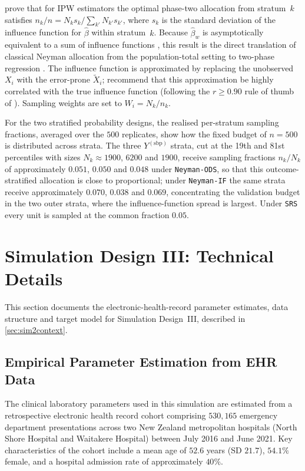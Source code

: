 \citet[Section~4.1]{amorim2021two} prove that for IPW estimators the optimal phase-two allocation from stratum~$k$ satisfies $n_k / n = N_k s_k / \sum_{k'} N_{k'} s_{k'}$, where $s_k$ is the standard deviation of the influence function for $\hat{\beta}$ within stratum~$k$. Because $\hat{\beta}_w$ is asymptotically equivalent to a sum of influence functions \citep[eq.~10]{amorim2021two}, this result is the direct translation of classical Neyman allocation from the population-total setting to two-phase regression \citep{lumley2011connections, mcisaac2014response}. The influence function is approximated by replacing the unobserved $X_i$ with the error-prone $\tilde{X}_i$; \citet{amorim2021two} recommend that this approximation be highly correlated with the true influence function (following the $r \geq 0.90$ rule of thumb of \citealt{sarndal1992model}). Sampling weights are set to $W_i = N_k / n_k$.

For the two stratified probability designs, the realised per-stratum sampling fractions, averaged over the $500$ replicates, show how the fixed budget of $n = 500$ is distributed across strata. The three $Y^{(\mathrm{sbp})}$ strata, cut at the 19th and 81st percentiles with sizes $N_k \approx 1900$, $6200$ and $1900$, receive sampling fractions $n_k/N_k$ of approximately $0.051$, $0.050$ and $0.048$ under \texttt{Neyman-ODS}, so that this outcome-stratified allocation is close to proportional; under \texttt{Neyman-IF} the same strata receive approximately $0.070$, $0.038$ and $0.069$, concentrating the validation budget in the two outer strata, where the influence-function spread is largest. Under \texttt{SRS} every unit is sampled at the common fraction $0.05$.


\section{Simulation Design III: Technical Details}
\label{app:sim2}
This section documents the electronic-health-record parameter estimates, data structure and target model for Simulation Design~III, described in \ref{sec:sim2context}.
\subsection{Empirical Parameter Estimation from EHR Data}
\label{app:sim2_ehr}

The clinical laboratory parameters used in this simulation are estimated from a retrospective electronic health record cohort comprising $530{,}165$ emergency department presentations across two New Zealand metropolitan hospitals (North Shore Hospital and Waitakere Hospital) between July 2016 and June 2021. Key characteristics of the cohort include a mean age of $52.6$ years (SD $21.7$), $54.1\%$ female, and a hospital admission rate of approximately $40\%$.

